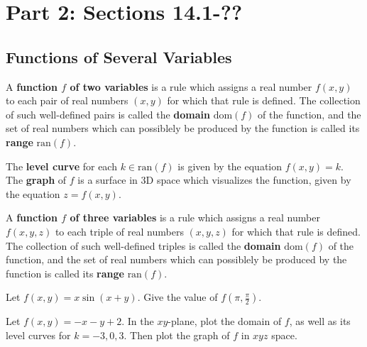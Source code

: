 \documentclass[letterpaper, twoside, 12pt]{book}
\begin{document}
\setcounter{chapter}{1}

\chapter{Part 2: Sections 14.1-??}

\setcounter{chapter}{14}
\setcounter{section}{0}

\section{Functions of Several Variables} %

\begin{definition}
  A \textbf{function $f$ of two variables} is a rule which assigns a
  real number $f(x,y)$ to each pair of real numbers $(x,y)$ for which
  that rule is defined.
  The collection of such well-defined pairs is called the
  \textbf{domain} $\text{dom}(f)$ of the function, and the set of
  real numbers which
  can possiblely be produced by the function is called its
  \textbf{range} $\text{ran}(f)$.
\end{definition}

\begin{definition}
  The \textbf{level curve} for each $k\in\text{ran}(f)$ is given by the
  equation $f(x,y)=k$.
  The \textbf{graph} of $f$ is a surface in 3D space which visualizes the function, given by the equation $z=f(x,y)$.
\end{definition}

\begin{definition}
  A \textbf{function $f$ of three variables} is a rule which assigns a
  real number $f(x,y,z)$ to each triple of real numbers $(x,y,z)$ for which
  that rule is defined.
  The collection of such well-defined triples is called the
  \textbf{domain} $\text{dom}(f)$ of the function, and the set of
  real numbers which
  can possiblely be produced by the function is called its
  \textbf{range} $\text{ran}(f)$.
\end{definition}

          \begin{problem}
            Let $f(x,y)=x\sin(x+y)$. Give the value of $f(\pi,\frac{\pi}{2})$.
          \end{problem}

          \begin{solution}

          \end{solution}

          \begin{problem}
            Let $f(x,y)=-x-y+2$. In the $xy$-plane, plot the domain of $f$,
            as well as its level curves for $k=-3,0,3$. Then plot the graph
            of $f$ in $xyz$ space.
          \end{problem}
\end{document}
